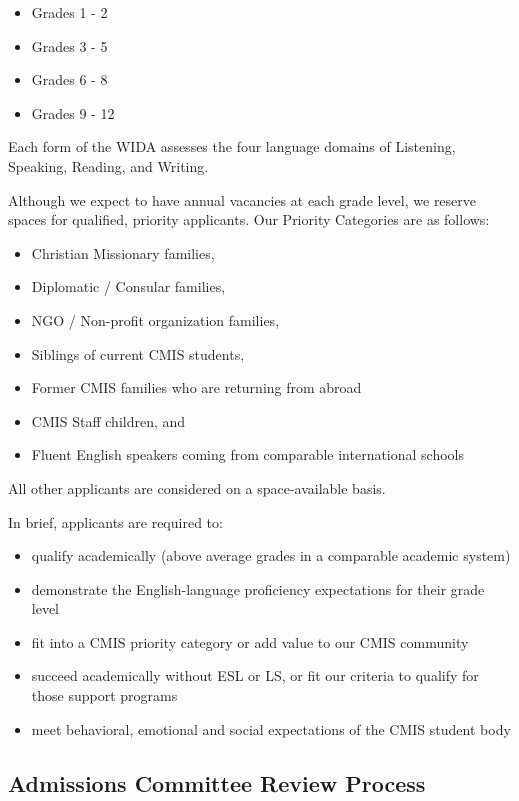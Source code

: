 \begin{itemize}
\item Grades 1 - 2
\item Grades 3 - 5
\item Grades 6 - 8
\item Grades 9 - 12
\end{itemize}


Each form of the WIDA assesses the four language domains of Listening, Speaking, Reading, and Writing.  


Although we expect to have annual vacancies at each grade level, we reserve spaces for qualified, priority applicants.  Our Priority Categories are as follows:  
\begin{itemize}
\item Christian Missionary families,
\item Diplomatic / Consular families,
\item NGO / Non-profit organization families,
\item Siblings of current CMIS students,
\item Former CMIS families who are returning from abroad
\item CMIS Staff children, and
\item Fluent English speakers coming from comparable international schools
\end{itemize}

All other applicants are considered on a space-available basis.

In brief, applicants are required to:

\begin{itemize}
\item qualify academically (above average grades in a comparable academic system)
\item demonstrate the English-language proficiency expectations for their grade level
\item fit into a CMIS priority category or add value to our CMIS community
\item succeed academically without ESL or LS, or fit our criteria to qualify for those support programs
\item meet behavioral, emotional and social expectations of the CMIS student body
\end{itemize}

\subsection{Admissions Committee Review Process}

